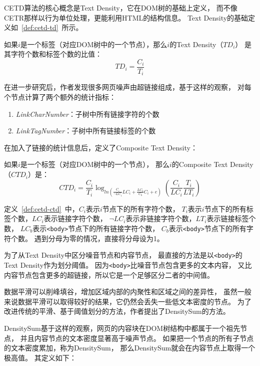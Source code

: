 CETD算法的核心概念是Text Density，它在DOM树的基础上定义，
而不像CETR那样以行为单位处理，更能利用HTML的结构信息。
Text Density的基础定义如~\ref{def:cetd-td}~所示。

\begin{definition}
\label{def:cetd-td}
如果$i$是一个标签（对应DOM树中的一个节点），那么$i$的Text Density（$TD_i$）
是其字符个数和标签个数的比值：
\begin{equation}
TD_i = \frac{C_i}{T_i}
\end{equation}
\end{definition}

在进一步研究后，作者发现很多网页噪声由超链接组成，基于这样的观察，
对每个节点计算了两个额外的统计指标：
\begin{enumerate}
\item \textit{LinkCharNumber}：子树中所有链接字符的个数
\item \textit{LinkTagNumber}：子树中所有链接标签的个数
\end{enumerate}

在加入了链接的统计信息后，定义了Composite Text Density：

\begin{definition}
\label{def:cetd-ctd}
如果$i$是一个标签（对应DOM树中的一个节点），
那么$i$的Composite Text Density（$CTD_i$）是：
\begin{equation}
CTD_i = \frac{C_i}{T_i}\log_{ln(\frac{C_i}{\neg LC_i}LC_i + 
\frac{LC_b}{C_b}C_i + e)}(\frac{C_i}{LC_i}\frac{T_i}{LT_i})
\end{equation}
\end{definition}

定义~\ref{def:cetd-ctd}~中，$C_i$表示$i$节点下的所有字符个数，
$T_i$表示$i$节点下的所有标签个数，$LC_i$表示链接字符个数，
$\neg LC_i$表示非链接字符个数，$LT_i$表示链接标签个数，
$LC_b$表示\texttt{<body>}节点下的所有链接字符个数，
$C_b$表示\texttt{<body>}节点下的所有字符个数。
遇到分母为零的情况，直接将分母设为1。

为了从Text Density中区分噪音节点和内容节点，
最直接的方法是以\texttt{<body>}的Text Density作为划分阈值。
因为\texttt{<body>}比噪音节点包含更多的文本内容，
又比内容节点包含更多的超链接，所以它是一个足够区分二者的中间值。

数据平滑可以削峰填谷，增加区域内部的内聚性和区域之间的差异性，
虽然一般来说数据平滑可以取得较好的结果，它仍然会丢失一些低文本密度的节点。
为了改进传统的平滑、基于阈值划分的方法，作者提出了DensitySum的方法。

DensitySum基于这样的观察，网页的内容块在DOM树结构中都属于一个祖先节点，
并且内容节点的文本密度显著高于噪声节点。
如果把一个节点的所有子节点的文本密度累加，称为DensitySum，
那么DensitySum就会在内容节点上取得一个极高值。
其定义如下：

